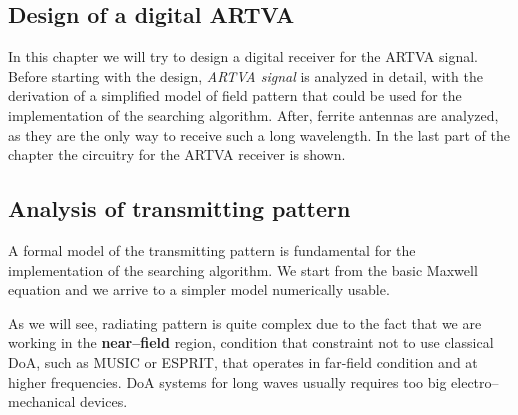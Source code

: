 
\begin{fullwidth}
\chapter{Design of a digital ARTVA \label{ch:chapter2}}
\end{fullwidth}
\minitoc

In this chapter we will try to design a digital receiver for the ARTVA signal. Before starting with the design, \emph{ARTVA signal} is analyzed in detail, with the derivation of a simplified model of field pattern that could be used  for the implementation of the searching algorithm. After, ferrite antennas are analyzed, as they are the only way to receive such a long wavelength. In the last part of the chapter the circuitry for the ARTVA receiver is shown.

\section{Analysis of transmitting pattern}

A formal model of the transmitting pattern is fundamental for the implementation of the searching algorithm. We start from the basic Maxwell equation and we arrive to a simpler model numerically usable.

As we will see, radiating pattern is quite complex due to the fact that we are working in the \textbf{near--field} region, condition that constraint not to use classical DoA, such as MUSIC or ESPRIT, that operates in far-field condition and at higher frequencies. DoA systems for long waves usually requires too big electro--mechanical devices.

